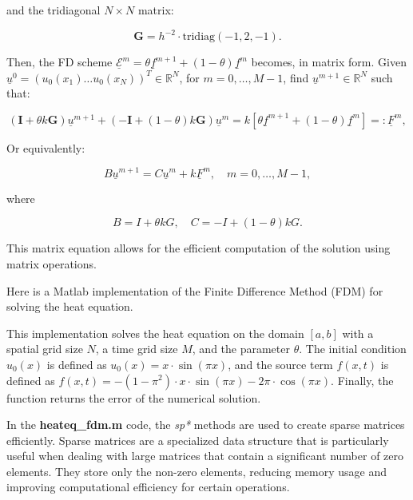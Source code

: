 and the tridiagonal $N \times N$ matrix:

\[
\textbf{G} = h^{-2} \cdot \text{tridiag}(-1, 2, -1).
\]

Then, the FD scheme $\underline{\mathcal{E}}^{m} = \theta \underline{f}^{m+1} + (1 - \theta) \underline{f}^{m}$ becomes, in matrix form. Given $\underline{u}^{0} = (u_{0}(x_{1}) \hdots u_{0}(x_{N}))^T  \in \mathbb{R}^{N}$, for $m = 0, \ldots, M-1$, find $\underline{u}^{m+1} \in \mathbb{R}^{N}$ such that:

\[
(\textbf{I} + \theta k \textbf{G}) \underline{u}^{m+1} + (-\textbf{I} + (1 - \theta) k \textbf{G}) \underline{u}^{m} = k [\theta \underline{f}^{m+1} + (1 - \theta) \underline{f}^{m}] =: \underline{F}^{m},
\]

Or equivalently:

\[
B \underline{u}^{m+1} = C \underline{u}^{m} + k \underline{F}^{m}, \quad m = 0, \ldots, M-1,
\]

where

\[
B = I + \theta kG, \quad C = -I + (1 - \theta) kG.
\]

This matrix equation allows for the efficient computation of the solution using matrix operations.


Here is a Matlab implementation of the Finite Difference Method (FDM) for solving the heat equation.

This implementation solves the heat equation on the domain $[a, b]$ with a spatial grid size $N$, a time grid size $M$, and the parameter $\theta$. The initial condition $u_0(x)$ is defined as $u_0(x) = x \cdot \sin(\pi x)$, and the source term $f(x, t)$ is defined as $f(x, t) = -(1-\pi^2) \cdot x \cdot \sin(\pi x) - 2\pi \cdot \cos(\pi x)$. Finally, the function returns the error of the numerical solution.

\newpage



In the \textbf{heateq\_fdm.m} code, the \textit{sp*} methods are used to create sparse matrices efficiently. Sparse matrices are a specialized data structure that is particularly useful when dealing with large matrices that contain a significant number of zero elements. They store only the non-zero elements, reducing memory usage and improving computational efficiency for certain operations.

